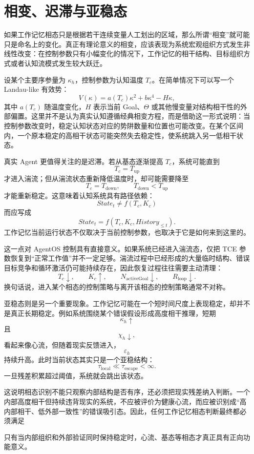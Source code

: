 \section{相变、迟滞与亚稳态}

如果工作记忆相态只是根据若干连续变量人工划出的区域，那么所谓“相变”就可能只是命名上的变化。真正有理论意义的相变，应该表现为系统宏观组织方式发生非线性改变：在控制参数只有小幅变化的情况下，工作记忆的相干结构、目标组织方式或者认知流模式发生较大跃迁。

设某个主要序参量为 $\kappa_h$，控制参数为认知温度 $T_c$。在简单情况下可以写一个 Landau-like 有效势：
\[
V(\kappa)
=
a(T_c)\kappa^2
+
b\kappa^4
-
H\kappa,
\]
其中 $a(T_c)$ 随温度变化，$H$ 表示当前 Goal、$\Theta$ 或其他慢变量对结构相干性的外部偏置。这里并不是认为真实认知遵循经典相变方程，而是借助这一形式说明：当控制参数改变时，稳定认知状态对应的势阱数量和位置也可能改变。在某个区间内，一个原本稳定的高相干状态可能突然失去稳定性，使系统跳入另一低相干状态。

真实 Agent 更值得关注的是迟滞。若从基态逐渐提高 $T_c$，系统可能直到
\[
T_c=T_{\mathrm{up}}
\]
才进入湍流；但从湍流状态重新降低温度时，却可能需要降至
\[
T_c=T_{\mathrm{down}},
\qquad
T_{\mathrm{down}}<T_{\mathrm{up}}
\]
才能重新稳定。这意味着认知系统具有路径依赖：
\[
State_t
\neq
f(T_c,K_c)
\]
而应写成
\[
State_t
=
f(
T_c,K_c,
History_{\leq t}
).
\]
工作记忆当前运行状态不仅取决于当前控制参数，也取决于它是如何来到这里的。

这一点对 AgentOS 控制具有直接意义。如果系统已经进入湍流态，仅把 TCE 参数恢复到“正常工作值”并不一定足够。湍流过程中已经形成的大量临时结构、错误目标竞争和循环激活仍可能持续存在，因此恢复过程往往需要主动清理：
\[
T_c\downarrow,\qquad
K_c\uparrow,\qquad
N_{\mathrm{activeGoal}}\downarrow,
\qquad
R_{\mathrm{loop}}\downarrow.
\]
换句话说，进入某个相态的控制策略与离开该相态的控制策略通常不对称。

亚稳态则是另一个重要现象。工作记忆可能在一个短时间尺度上表现稳定，却并不是真正长期稳定。例如系统围绕某个错误假设形成高度相干推理，短期
\[
\kappa_h\uparrow
\]
且
\[
\chi_h\downarrow,
\]
看起来像心流，但随着现实反馈进入，
\[
\varepsilon_h
\]
持续升高。此时当前状态其实只是一个亚稳结构：
\[
\tau_{\mathrm{local}}
\ll
\tau_{\mathrm{escape}}
<\infty.
\]
一旦残差积累超过阈值，系统就会跳出该状态。

这说明相态识别不能只观察内部结构是否有序，还必须把现实残差纳入判断。一个内部高度相干但持续违背现实的系统，不应被评价为健康心流，而应被识别成“高内部相干、低外部一致性”的错误吸引态。因此，任何工作记忆相态判断最终都必须满足
\begin{statementbox}
\centering
{}
\end{statementbox}
只有当内部组织和外部验证同时保持稳定时，心流、基态等相态才真正具有正向功能意义。

